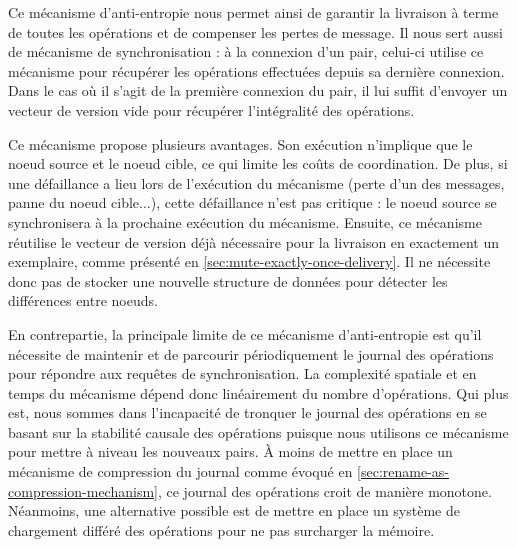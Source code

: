 Ce mécanisme d'anti-entropie nous permet ainsi de garantir la livraison à terme de toutes les opérations et de compenser les pertes de message.
Il nous sert aussi de mécanisme de synchronisation : à la connexion d'un pair, celui-ci utilise ce mécanisme pour récupérer les opérations effectuées depuis sa dernière connexion.
Dans le cas où il s'agit de la première connexion du pair, il lui suffit d'envoyer un vecteur de version vide pour récupérer l'intégralité des opérations.

Ce mécanisme propose plusieurs avantages.
Son exécution n'implique que le noeud source et le noeud cible, ce qui limite les coûts de coordination.
De plus, si une défaillance a lieu lors de l'exécution du mécanisme (perte d'un des messages, panne du noeud cible...), cette défaillance n'est pas critique : le noeud source se synchronisera à la prochaine exécution du mécanisme.
Ensuite, ce mécanisme réutilise le vecteur de version déjà nécessaire pour la livraison en exactement un exemplaire, comme présenté en \autoref{sec:mute-exactly-once-delivery}.
Il ne nécessite donc pas de stocker une nouvelle structure de données pour détecter les différences entre noeuds.

En contrepartie, la principale limite de ce mécanisme d'anti-entropie est qu'il nécessite de maintenir et de parcourir périodiquement le journal des opérations pour répondre aux requêtes de synchronisation.
La complexité spatiale et en temps du mécanisme dépend donc linéairement du nombre d'opérations.
Qui plus est, nous sommes dans l'incapacité de tronquer le journal des opérations en se basant sur la stabilité causale des opérations puisque nous utilisons ce mécanisme pour mettre à niveau les nouveaux pairs.
À moins de mettre en place un mécanisme de compression du journal comme évoqué en \autoref{sec:rename-as-compression-mechanism}, ce journal des opérations croit de manière monotone.
Néanmoins, une alternative possible est de mettre en place un système de chargement différé des opérations pour ne pas surcharger la mémoire.
